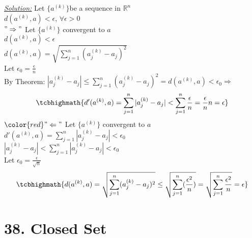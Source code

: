\documentclass{book}
\begin{document}
\begin{tcolorbox}[enhanced,attach boxed title to top center={yshift=-3mm,yshifttext=-1mm},
colback=blue!5!white,colframe=blue!75!black,colbacktitle=red!80!black,
title=Exercise 37.9 (b):,fonttitle=\bfseries,
boxed title style={size=small,colframe=red!50!black} ]
\textit{\color{blue}\underline{Solution:}}
Let $\{a^{(k)}\}$be a sequence in $\mathbb{R}^n$\\
$d(a^{(k)},a)<\epsilon$, $\forall\epsilon>0$\\
{\color{red}$"\Rightarrow"$} Let $\{a^{(k)}\}$ convergent to $a$\\
$d(a^{(k)},a)<\epsilon$\\
$d(a^{(k)},a)=\sqrt{\sum_{j=1}^{n}(a_j^{(k)}-a_j)^2}$\\
Let $\epsilon_0=\frac{\epsilon}{n}$\\
By Theorem: $|a_j^{(k)}-a_j|\leq{\sum_{j=1}^{n}(a_j^{(k)}-a_j)^2}=d(a^{(k)},a)<\epsilon_0\Rightarrow$\\ 
$$\tcbhighmath{d'(a^{(k)},a)=\sum_{j=1}^{n}|a_j^{(k)}-a_j|<\sum_{j=1}^{n}\frac{\epsilon}{n}=\frac{\epsilon}{n}
n=\epsilon}$$
$\color{red}"\Leftarrow"$ Let $\{a^{(k)}\}$ convergent to $a$\\
$d'(a^{(k)},a)=\sum_{j=1}^{n}|a_j^{(k)}-a_j|<\epsilon_0$\\
$|a_j
^{(k)}-a_j|<\sum_{j=1}^{n}|a_j^{(k)}-a_j|<\epsilon_0$\\
Let $\epsilon_0=\frac{\epsilon}{\sqrt{n}}$\\
$$\tcbhighmath{d(a^{(k)},a)=\sqrt{\sum_{j=1}^{n}(a_j^{(k)}-a_j)^2}\leq 
\sqrt{\sum_{j=1}^{n}(\frac{\epsilon^2}{n})}=\sqrt{\sum_{j=1}^{n}\frac{\epsilon^2}{n}}=\epsilon}$$
\end{tcolorbox}

\section{38. Closed Set}
\end{document}
